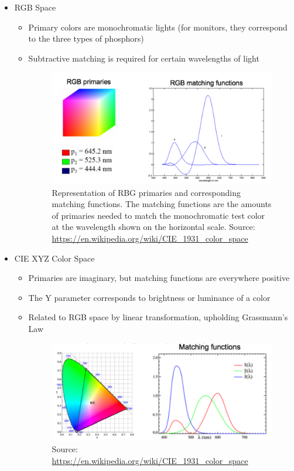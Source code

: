 \documentclass{article}
\begin{document}
    \begin{itemize}
    \item RGB Space
     \begin{itemize}
     \item Primary colors are monochromatic lights (for monitors, they correspond to the three types of phosphors)
     \item Subtractive matching is required for certain wavelengths of light

	  \begin{figure}[h!]
      \centering
      \includegraphics[width=10cm]{rgb1.png}
      \caption{Representation of RBG primaries and corresponding matching functions. The matching functions are the amounts of primaries needed to match the monochromatic test color at the wavelength shown on the horizontal scale. Source: \url{https://en.wikipedia.org/wiki/CIE_1931_color_space}}
      \end{figure}

     \end{itemize}

    \item CIE XYZ Color Space
     \begin{itemize}
     \item Primaries are imaginary, but matching functions are everywhere positive
     \item The Y parameter corresponds to brightness or luminance of a color
     \item Related to RGB space by linear transformation, upholding Grassmann's Law

	  \begin{figure}[h!]
      \centering
      \includegraphics[width=10cm]{xyz1.png}
      \caption{Source: \url{https://en.wikipedia.org/wiki/CIE_1931_color_space}}
      \end{figure}

     \end{itemize}
    \end{itemize}
\end{document}
